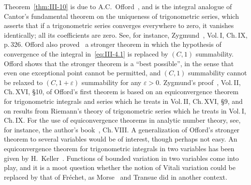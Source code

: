 \noindent Theorem~\ref{thm:III-10} is due to A.C.~Offord~\cite{offord1936}, and is the integral analogue of Cantor's fundamental theorem on the uniqueness of trigonometric series, which asserts that if a trigonometric series converges everywhere to zero, it vanishes identically; all its coefficients are zero. See, for instance, Zygmund~\cite{zygmund1959}, Vol.\,I, Ch.\,IX, p.\,326. Offord also proved~\cite{offord1937} a stronger theorem in which the hypothesis of convergence of the integral in~\eqref{eq:III-4.1} is replaced by $(C,1)$ summability. Offord shows that the stronger theorem is a ``best possible'', in the sense that even one exceptional point cannot be permitted, and $(C,1)$ summability cannot be relaxed to $(C,1+\varepsilon)$ summability for any $\varepsilon>0$. Zygmund's proof~\cite{zygmund1959}, Vol.\,II, Ch.\,XVI, §10, of Offord's first theorem is based on an equiconvergence theorem for trigonometric integrals and series which he treats in Vol.\,II, Ch.\,XVI, §9, and on results from Riemann's theory of trigonometric series which he treats in Vol.\,I, Ch.\,IX. For the use of equiconvergence theorems in analytic number theory, see, for instance, the author's book~\cite{chandrasekharan1970}, Ch.\,VIII. A generalization of Offord's stronger theorem to several variables would be of interest, though perhaps not easy. An equiconvergence theorem for trigonometric integrals in two variables has been given by H.~Keller~\cite{keller1976}. Functions of bounded variation in two variables come into play, and it is a moot question whether the notion of Vitali variation could be replaced by that of Fr\'echet, as Morse~\cite{morsetransue1950} and Transue did in another context.
